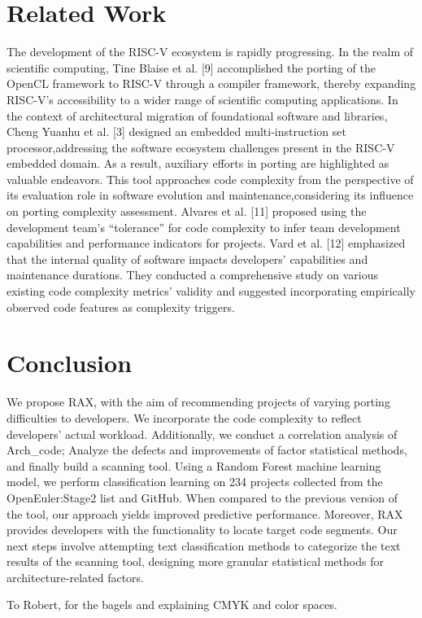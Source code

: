 \documentclass[sigconf,screen,review,anonymous]{acmart}
\begin{document}
\section{Related Work}
The development of the RISC-V ecosystem is rapidly progressing.
In the realm of scientific computing, Tine Blaise et al. [9] accomplished the porting of the OpenCL framework to RISC-V through a compiler framework, thereby expanding RISC-V's accessibility to a wider range of scientific computing applications.
In the context of architectural migration of foundational software and libraries, Cheng Yuanhu et al. [3] designed an embedded multi-instruction set processor,addressing the software ecosystem challenges present in the RISC-V embedded domain.
As a result, auxiliary efforts in porting are highlighted as valuable endeavors.
This tool approaches code complexity from the perspective of its evaluation role in software evolution and maintenance,considering its influence on porting complexity assessment.
Alvares et al. [11] proposed using the development team's ``tolerance'' for code complexity to infer team development capabilities and performance indicators for projects.
Vard et al. [12] emphasized that the internal quality of software impacts developers' capabilities and maintenance durations.
They conducted a comprehensive study on various existing code complexity metrics' validity and suggested incorporating empirically observed code features as complexity triggers.

\section{Conclusion}
We propose RAX, with the aim of recommending projects of varying porting difficulties to developers.
We incorporate the code complexity to reflect developers' actual workload.
Additionally, we conduct a correlation analysis of Arch\_code; Analyze the defects and improvements of factor statistical methods, and finally build a scanning tool.
Using a Random Forest machine learning model, we perform classification learning on 234 projects collected from the OpenEuler:Stage2 list and GitHub.
When compared to the previous version of the tool, our approach yields improved predictive performance.
Moreover, RAX provides developers with the functionality to locate target code segments.
Our next steps involve attempting text classification methods to categorize the text results of the scanning tool, designing more granular statistical methods for architecture-related factors.

\begin{acks}
To Robert, for the bagels and explaining CMYK and color spaces.
\end{acks}

% 
% 
\end{document}
